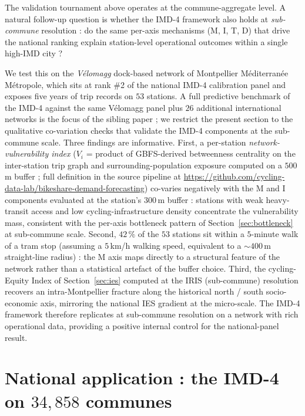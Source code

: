 \documentclass[11pt,a4paper]{article}
\begin{document}
The validation tournament above operates at the
commune-aggregate level.  A natural follow-up question is whether
the IMD-4 framework also holds at \emph{sub-commune} resolution :
do the same per-axis mechanisms (M, I, T, D) that drive the
national ranking explain station-level operational outcomes
within a single high-IMD city ?

We test this on the \emph{V\'elomagg} dock-based network of
Montpellier M\'editerran\'ee M\'etropole, which sits at rank
\#2 of the national IMD-4 calibration panel and exposes five
years of trip records on $53$ stations.  A full predictive
benchmark of the IMD-4 against the same V\'elomagg panel plus
$26$ additional international networks is the focus of the
sibling paper \citet{FossePallares2026bikeshareDemand}; we
restrict the present section to the qualitative co-variation
checks that validate the IMD-4 components at the sub-commune
scale.  Three findings are
informative.  First, a per-station \emph{network-vulnerability
index} ($V_i$ = product of GBFS-derived betweenness centrality
on the inter-station trip graph and surrounding-population
exposure computed on a $500$\,m buffer ; full definition in
the source pipeline at
\url{https://github.com/cycling-data-lab/bikeshare-demand-forecasting})
co-varies negatively with the M and I components evaluated at
the station's $300\,$m buffer : stations with weak heavy-transit
access and low cycling-infrastructure density concentrate the
vulnerability mass, consistent with the per-axis bottleneck
pattern of Section~\ref{sec:bottleneck} at sub-commune scale.  Second, $42\,\%$ of the $53$
stations sit within a $5$-minute walk of a tram stop (assuming
a $5$\,km/h walking speed, equivalent to a $\sim 400$\,m
straight-line radius) : the M axis maps directly to a structural
feature of the network rather than a statistical artefact of the
buffer choice.  Third,
the cycling-Equity Index of Section~\ref{sec:ies} computed at
the IRIS (sub-commune) resolution recovers an intra-Montpellier
fracture along the historical north / south socio-economic axis,
mirroring the national IES gradient at the micro-scale.  The
IMD-4 framework therefore replicates at sub-commune resolution
on a network with rich operational data, providing a positive
internal control for the national-panel result.

\section{National application : the IMD-4 on $34{,}858$ communes}
\label{sec:national}
\end{document}
